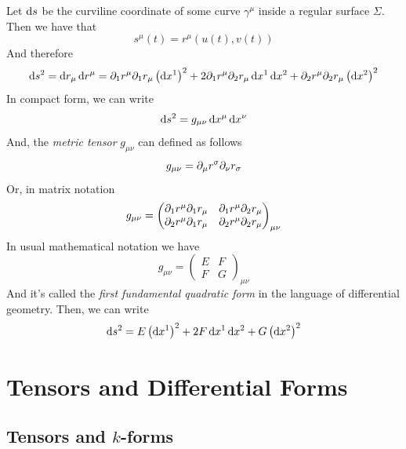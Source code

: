 \documentclass[../complete.tex]{subfiles}
\begin{document}
\begin{dfn}
	Let $\operatorname{d\!}{s}$ be the curviline coordinate of some curve $\gamma^\mu$ inside a regular surface $\Sigma$. Then we have that
	\begin{equation}
		s^\mu(t)=r^\mu(u(t),v(t))
		\label{eq:softsurf}
	\end{equation}
	And therefore
	\begin{equation}
		\operatorname{d\!}{s}^2=\operatorname{d\!}{r_\mu}\operatorname{d\!}{r^\mu}=\partial_1r^\mu\partial_1r_\mu\left(\operatorname{d\!}{x^1}\right)^2+2\partial_1r^\mu\partial_2r_\mu\operatorname{d\!}{x^1}\operatorname{d\!}{x^2}+\partial_2r^\mu\partial_2r_\mu\left( \operatorname{d\!}{x^2} \right)^2
		\label{eq:diffssurf}
	\end{equation}
	In compact form, we can write
	\begin{equation}
		\operatorname{d\!}{s}^2=g_{\mu\nu}\operatorname{d\!}{x^\mu}\operatorname{d\!}{x^\nu}
		\label{eq:metrictensorphys}
	\end{equation}
	And, the \textit{metric tensor} $g_{\mu\nu}$ can defined as follows
	\begin{equation}
		g_{\mu\nu}=\partial_\mu r^\sigma\partial_\nu r_\sigma
		\label{eq:metrictensor}
	\end{equation}
	Or, in matrix notation
	\begin{equation}
		g_{\mu\nu}=\begin{pmatrix}\partial_1r^\mu\partial_1r_\mu&\partial_1r^\mu\partial_2r_\mu\\\partial_2r^\mu\partial_1r_\mu&\partial_2r^\mu\partial_2r_\mu\end{pmatrix}_{\mu\nu}
		\label{eq:delmetrictensor}
	\end{equation}
	In usual mathematical notation we have
	\begin{equation}
		g_{\mu\nu}=\begin{pmatrix}E&F\\F&G\end{pmatrix}_{\mu\nu}
		\label{eq:metrictensro}
	\end{equation}
	And it's called the \textit{first fundamental quadratic form} in the language of differential geometry. Then, we can write
	\begin{equation}
		\operatorname{d\!}{s}^2=E\left(\operatorname{d\!}{x^1}\right)^2+2F\operatorname{d\!}{x^1}\operatorname{d\!}{x^2}+G\left(\operatorname{d\!}{x^2}\right)^2
		\label{eq:diffsfff}
	\end{equation}
\end{dfn}
\section{Tensors and Differential Forms}
\subsection{Tensors and $k$-forms}
\end{document}
